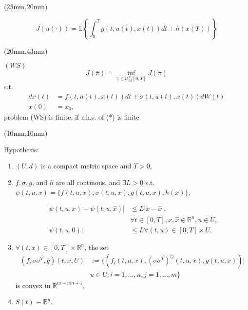 \begin{frame}[plain]
		\begin{textblock*}{80mm}(25mm,20mm)
		\begin{yellowbox}{}
			\begin{equation*}
				J(u(\cdot))= \mathbb{E}\left\{\int_{0}^{T}g(t,u(t),x(t))dt+h(x(T))\right\}
			\end{equation*}
		\end{yellowbox}
	\end{textblock*}
	
	
	\begin{textblock*}{90mm}(20mm,43mm)
		\begin{graybox}{$(WS)$}
				\begin{equation*}
					J(\bar{\pi})=\inf_{\pi\in \mathcal{U}^w_{ad}[0,T]} J(\pi)
					\tag{*}
				\end{equation*}
				s.t.
				\begin{align*}
					dx(t)&=
					f(t,u(t),x(t))dt+\sigma(t,u(t),x(t))dW(t)\\
					x(0)&=
					x_0,
				\end{align*}
				\tcblower
					problem (WS) is finite, if r.h.s. of (*) is finite. 
			\end{graybox}
	\end{textblock*}
\end{frame}
\begin{frame}[plain]
	\begin{textblock*}{110mm}(10mm,10mm)
		\begin{graybox}{Hypothesis:}
			\begin{enumerate}[(\textbf{{SE}}-1)]
				\item
					$(U,d)$ is a compact metric space and $T>0$,
				\item
					$f,\sigma,g$, and $h$ are all continous, and $\exists L>0$ s.t. $\psi(t,u,x)=\{f(t,u,x),\sigma(t,u,x),g(t,u,x),h(x)\}$, 
					
					\begin{align*}
						|\psi(t,u,x)-\psi(t,u,\hat{x})|&\leq L|x-\hat{x}|,\\
						&\forall t\in [0,T], x,\hat{x}\in \mathbb{R}^n,u\in U,\\
						|\psi(t,u,0)|&\leq L \forall (t,u)\in[0,T]\times U.
					\end{align*}  
				\item
					$\forall (t,x)\in [0,T]\times \mathbb{R}^n$, the set
					\begin{align*}
						(f,\sigma\sigma^T,g)(t,x,U)&:=\{(f_i(t,u,x),(\sigma\sigma^T)^{ij}(t,u,x),g(t,u,x))|\\
						&u\in U,i=1,\ldots,n,j=1,\ldots,m\}
					\end{align*}
					is convex in $\mathbb{R}^{m+nm+1}$,
				\item 
					$S(t)\equiv\mathbb{R}^n$.
			\end{enumerate}	
		\end{graybox}
	\end{textblock*}
\end{frame}
